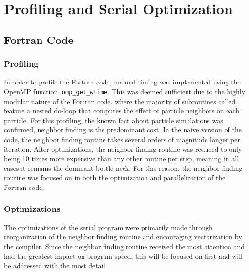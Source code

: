 \documentclass{scrartcl}
\begin{document}
    \section{Profiling and Serial Optimization}
  
  \subsection{Fortran Code}
  \subsubsection{Profiling}
  In order to profile the Fortran code, manual timing was implemented using the OpenMP function, \texttt{omp\_get\_wtime}. This was deemed sufficient due to the highly modular nature of the Fortran code, where the majority of subroutines called feature a nested do-loop that computes the effect of particle neighbors on each particle. For this profiling, the known fact about particle simulations was confirmed, neighbor finding is the predominant cost. In the naive version of the code, the neighbor finding routine takes several orders of magnitude longer per iteration. After optimizations, the neighbor finding routine was reduced to only being 10 times more expensive than any other routine per step, meaning in all cases it remains the dominant bottle neck. For this reason, the neighbor finding routine was focused on in both the optimization and parallelization of the Fortran code. 
  
  \subsubsection{Optimizations}
  The optimizations of the serial program were primarily made through reorganization of the neighbor finding routine and encouraging vectorization by the compiler. Since the neighbor finding routine received the most attention and had the greatest impact on program speed,  this will be focused on first and will be addressed with the most detail.
  
\end{document}
